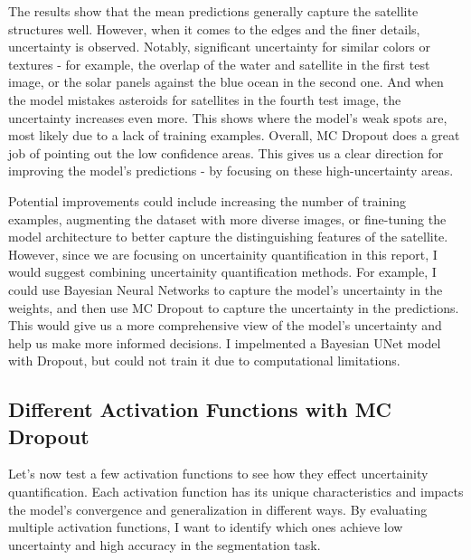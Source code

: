 \documentclass{article}
\begin{document}
The results show that the mean predictions generally capture the satellite structures well. However, when it comes to the 
edges and the finer details, uncertainty is observed. Notably, significant uncertainty for similar colors or textures - 
for example, the overlap of the water and satellite in the first test image, or the solar panels against the blue ocean in the 
second one. And when the model mistakes asteroids for satellites in the fourth test image, the uncertainty increases 
even more. This shows where the model's weak spots are, most likely due to a lack of training examples. Overall, MC Dropout 
does a great job of pointing out the low confidence areas. This gives us a clear direction for improving the model's  
predictions - by focusing on these high-uncertainty areas.
\vspace{1em}

Potential improvements could include increasing the number of training examples, augmenting the dataset with more diverse
images, or fine-tuning the model architecture to better capture the distinguishing features of the satellite. However, 
since we are focusing on uncertainity quantification in this report, I would suggest combining uncertainity quantification
methods. For example, I could use Bayesian Neural Networks to capture the model's uncertainty in the weights, and then
use MC Dropout to capture the uncertainty in the predictions. This would give us a more comprehensive view of the model's
uncertainty and help us make more informed decisions.  I impelmented a Bayesian UNet model with Dropout, but could not 
train it due to computational limitations.


\subsection{Different Activation Functions with MC Dropout}

Let's now test a few activation functions to see how they effect uncertainity quantification. Each activation function has 
its unique characteristics and impacts the model's convergence and generalization in different ways. By evaluating multiple 
activation functions, I want to identify which ones achieve low uncertainty and high accuracy in the segmentation task.
\end{document}
